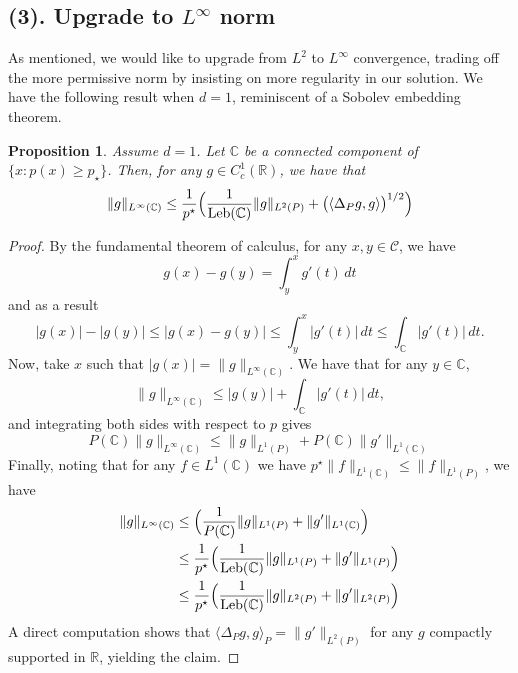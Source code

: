 \documentclass{article}
\newcommand{\Reals}{\mathbb{R}}
\newcommand{\1}{\mathbf{1}}
\newcommand{\Leb}{L}
\newcommand{\mc}[1]{\mathcal{#1}}
\newcommand{\mb}[1]{\mathbb{#1}}
\theoremstyle{alden}
\theoremstyle{aldenthm}
\newtheorem{proposition}{Proposition}
\theoremstyle{definition}
\theoremstyle{remark}
\begin{document}
\subsection{(3). Upgrade to $\Leb^{\infty}$ norm}
As mentioned, we would like to upgrade from $\Leb^2$ to $\Leb^{\infty}$ convergence, trading off the more permissive norm by insisting on more regularity in our solution. We have the following result when $d = 1$, reminiscent of a Sobolev embedding theorem.
\begin{proposition}
	\label{prop:}
	Assume $d = 1$. Let $\mb{C}$ be a connected component of $\{x:p(x) \geq p_{\star}\}$. Then, for any $g \in C_c^1(\Reals)$, we have that
	\begin{equation*}
	\|g\|_{\Leb^{\infty}(\mb{C})} \leq \frac{1}{p^{\star}}\Bigl(\frac{1}{\mathrm{Leb}(\mb{C})} \|g\|_{\Leb^2(P)} + \bigl(\langle \Delta_Pg , g \rangle\bigr)^{1/2}\Bigr)
	\end{equation*}
\end{proposition}
\begin{proof}
	By the fundamental theorem of calculus, for any $x,y \in \mc{C}$, we have
	\begin{equation*}
	g(x) - g(y) = \int_{y}^{x} g'(t) \,dt
	\end{equation*}
	and as a result
	\begin{equation*}
	\bigl|g(x)\bigr| - \bigl|g(y)\bigr| \leq \bigl|g(x) - g(y)\bigr| \leq \int_{y}^{x} \bigl|g'(t)\bigr| \,dt \leq \int_{\mb{C}} \bigl|g'(t)\bigr| \,dt.
	\end{equation*}
	Now, take $x$ such that $\bigl|g(x)\bigr| = \|g\|_{\Leb^{\infty}(\mb{C})}$. We have that for any $y \in \mb{C}$,
	\begin{equation*}
	\|g\|_{\Leb^{\infty}(\mb{C})} \leq \bigl|g(y)\bigr| + \int_{\mb{C}} \bigl|g'(t)\bigr| \,dt,
	\end{equation*}
	and integrating both sides with respect to $p$ gives
	\begin{equation*}
	P(\mb{C})\|g\|_{\Leb^{\infty}(\mb{C})} \leq \|g\|_{\Leb^1(P)} + P(\mb{C}) \|g'\|_{\Leb^1(\mb{C})}
	\end{equation*}
	Finally, noting that for any $f \in \Leb^1(\mb{C})$ we have $p^{\star} \|f\|_{\Leb^1(\mb{C})} \leq \|f\|_{\Leb^1(P)}$, we have
	\begin{align*}
	\|g\|_{\Leb^{\infty}(\mb{C})} & \leq \Bigl(\frac{1}{P(\mb{C})} \|g\|_{\Leb^1(P)} + \|g'\|_{\Leb^1(\mb{C})}\Bigr) \\
	& \leq \frac{1}{p^{\star}}\Bigl(\frac{1}{\mathrm{Leb}(\mb{C})} \|g\|_{\Leb^1(P)} + \|g'\|_{\Leb^1(P)}\Bigr) \\
	& \leq \frac{1}{p^{\star}}\Bigl(\frac{1}{\mathrm{Leb}(\mb{C})} \|g\|_{\Leb^2(P)} + \|g'\|_{\Leb^2(P)}\Bigr)
	\end{align*}
	A direct computation shows that $\langle\Delta_{P}g,g \rangle_{P} = \|g'\|_{\Leb^2(P)}$ for any $g$ compactly supported in $\Reals$, yielding the claim.
\end{proof}
\end{document}
